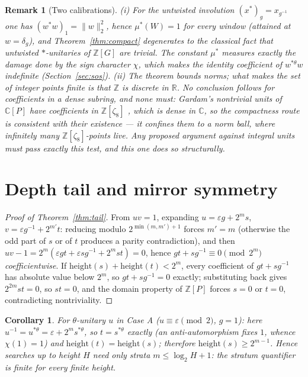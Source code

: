 \documentclass[11pt]{article}
\newtheorem{corollary}[theorem]{Corollary}
\newtheorem{remark}[theorem]{Remark}
\newcommand{\ZZ}{\mathbb{Z}}
\newcommand{\RR}{\mathbb{R}}
\newcommand{\thst}{{*\theta}}
\newcommand{\hgt}{\mathrm{height}}
\begin{document}
\begin{remark}[Two calibrations]\label{rem:untwisted}
(i) For the \emph{untwisted} involution $(x^*)_g=x_{g^{-1}}$ one has
$(w^*w)_1=\|w\|_2^2$, hence $\mu^*(W)=1$ for every window (attained at
$w=\delta_g$), and Theorem~\ref{thm:compact} degenerates to the
classical fact that untwisted $*$-unitaries of $\ZZ[G]$ are trivial.
The constant $\mu^*$ measures exactly the damage done by the sign
character $\chi$, which makes the identity coefficient of $w^{\thst}w$
indefinite (Section~\ref{sec:sos}).  (ii) The theorem bounds
\emph{norms}; what makes the set of integer points finite is that
$\ZZ$ is \emph{discrete} in $\RR$.  No conclusion follows for
coefficients in a dense subring, and none must: Gardam's nontrivial
units of $\mathbb{C}[P]$ have coefficients in $\ZZ[\zeta_8]$
\cite{GardamComplex2023}, which is dense in $\mathbb{C}$, so the
compactness route is consistent with their existence --- it confines
them to a norm ball, where infinitely many $\ZZ[\zeta_8]$-points
live.  Any proposed argument against integral units must pass exactly
this test, and this one does so structurally.
\end{remark}

\section{Depth tail and mirror symmetry}\label{sec:tail}

\begin{proof}[Proof of Theorem~\ref{thm:tail}]
From $uv=1$, expanding $u=\varepsilon g+2^ms$,
$v=\varepsilon g^{-1}+2^{m'}t$: reducing modulo $2^{\min(m,m')+1}$
forces $m'=m$ (otherwise the odd part of $s$ or of $t$ produces a
parity contradiction), and then
$uv-1=2^m(\varepsilon gt+\varepsilon sg^{-1}+2^mst)=0$, hence
$gt+sg^{-1}\equiv 0 \pmod{2^m}$ \emph{coefficientwise}.  If
$\hgt(s)+\hgt(t)<2^m$, every coefficient of $gt+sg^{-1}$ has absolute
value below $2^m$, so $gt+sg^{-1}=0$ exactly; substituting back gives
$2^{2m}st=0$, so $st=0$, and the domain property of $\ZZ[P]$
\cite{KLM} forces $s=0$ or $t=0$, contradicting nontriviality.
\end{proof}

\begin{corollary}
For $\theta$-unitary $u$ in Case A ($u\equiv\varepsilon\pmod 2$,
$g=1$): here $u^{-1}=u^{\thst}=\varepsilon+2^m s^{\thst}$, so $t=
s^{\thst}$ exactly (an anti-automorphism fixes $1$, whence
$\chi(1)=1$) and $\hgt(t)=\hgt(s)$; therefore $\hgt(s)\ge 2^{m-1}$.
Hence searches up to height $H$ need only strata $m\le \log_2 H+1$:
the stratum quantifier is finite for every finite height.
\end{corollary}
\end{document}
